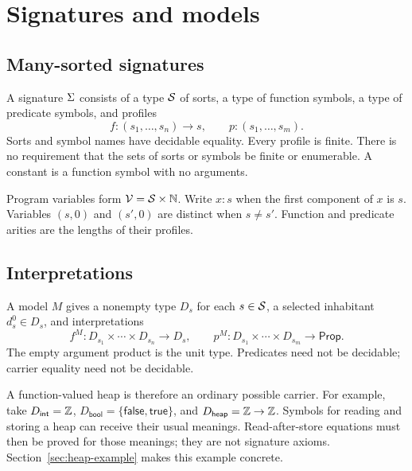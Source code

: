 \section{Signatures and models}\label{sec:signature}

\subsection{Many-sorted signatures}
\begin{definition}[Signature]
A signature $\Sigma$ consists of a type $\mathcal{S}$ of sorts, a type of function
symbols, a type of predicate symbols, and profiles
\[
 f:(s_1,\ldots,s_n)\to s,
 \qquad p:(s_1,\ldots,s_m).
\]
Sorts and symbol names have decidable equality. Every profile is finite.
There is no requirement that the sets of sorts or symbols be finite or
enumerable. A constant is a function symbol with no arguments.
\end{definition}

Program variables form $\mathcal{V}=\mathcal{S}\times\mathbb{N}$. Write $x:s$ when the first
component of $x$ is $s$. Variables $(s,0)$ and $(s',0)$ are distinct when
$s\ne s'$. Function and predicate arities are the lengths of their profiles.

\subsection{Interpretations}
\begin{definition}[Model]
A model $M$ gives a nonempty type $D_s$ for each $s\in\mathcal{S}$, a selected
inhabitant $d_s^0\in D_s$, and interpretations
\[
 f^M:D_{s_1}\times\cdots\times D_{s_n}\to D_s,
 \qquad
 p^M:D_{s_1}\times\cdots\times D_{s_m}\to\mathsf{Prop}.
\]
The empty argument product is the unit type. Predicates need not be decidable;
carrier equality need not be decidable.
\end{definition}

A function-valued heap is therefore an ordinary possible carrier. For example,
take $D_{\mathsf{int}}=\mathbb{Z}$, $D_{\mathsf{bool}}=\{\mathsf{false},\mathsf{true}\}$,
and $D_{\mathsf{heap}}=\mathbb{Z}\to\mathbb{Z}$. Symbols for reading and storing a heap can
receive their usual meanings. Read-after-store equations must then be proved
for those meanings; they are not signature axioms.
Section~\ref{sec:heap-example} makes this example concrete.

